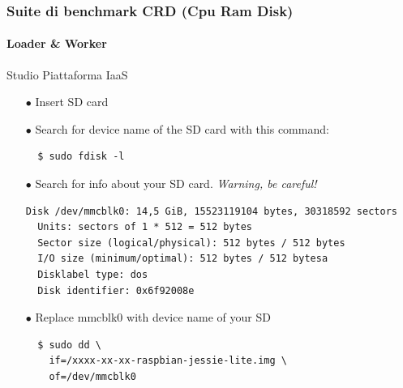 \documentclass{beamer}
\begin{document}
\begin{frame}[fragile]
\frametitle{\textbf{Suite di benchmark CRD (Cpu Ram Disk)}}
\framesubtitle{\textbf{Loader \& Worker}}
\begin{block}{Studio Piattaforma IaaS}
\begin{itemize}
\item[$\bullet$] Insert SD card
\item[$\bullet$] Search for device name of the SD card with this command:
\begin{lstlisting}
  $ sudo fdisk -l
\end{lstlisting}
\item[$\bullet$] Search for info about your SD card. \textit{Warning, be careful!}
\begin{lstlisting}[basicstyle=\tiny\ttfamily]
  Disk /dev/mmcblk0: 14,5 GiB, 15523119104 bytes, 30318592 sectors      
  Units: sectors of 1 * 512 = 512 bytes                                 
  Sector size (logical/physical): 512 bytes / 512 bytes                 
  I/O size (minimum/optimal): 512 bytes / 512 bytesa                    
  Disklabel type: dos                                                   
  Disk identifier: 0x6f92008e                                           
\end{lstlisting}
\item[$\bullet$] Replace mmcblk0 with device name of your SD
\begin{lstlisting}
  $ sudo dd \
    if=/xxxx-xx-xx-raspbian-jessie-lite.img \
    of=/dev/mmcblk0
\end{lstlisting}
\end{itemize}
\end{block}

\end{frame}

\end{document}
